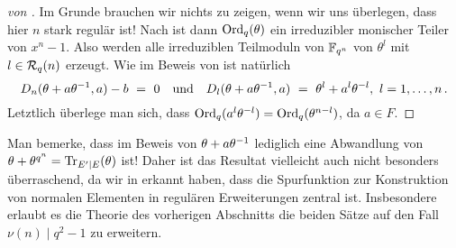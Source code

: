 \begin{proof}[von ]
  Im Grunde brauchen wir nichts zu zeigen, wenn wir uns überlegen, dass
  hier $n$ stark regulär ist! Nach 
  ist dann $\operatorname{Ord}_q(\theta)$ ein irreduzibler monischer Teiler von $x^n-1$. Also
  werden alle irreduziblen Teilmoduln von $\mathbb{F}_{q^n}$ von $\theta^l$ mit 
  $l\in \mathcal{R}_q(n)$ erzeugt.  Wie im Beweis von  ist
  natürlich 
  \[ D_n(\theta+a\theta\inv,a)-b \speq= 0 \quad\text{und}\quad
    D_l(\theta+a\theta\inv,a) \speq= \theta^l+a^l\theta^{-l},\ l=1,\ldots,n\,. \]
  Letztlich überlege man sich, dass $\operatorname{Ord}_q(a^l\theta^{-l}) =
  \operatorname{Ord}_q(\theta^{n-l})$, da $a \in F$. 
\end{proof}


Man bemerke, dass im Beweis von 
$\theta + a\theta^{-1}$ lediglich eine
Abwandlung von $\theta + \theta^{q^n} = \operatorname{Tr}_{E'\mid E}(\theta)$ ist!
Daher ist das Resultat vielleicht auch nicht besonders überraschend,
da wir in  erkannt haben, dass die Spurfunktion
zur Konstruktion von normalen Elementen in regulären Erweiterungen zentral ist.
Insbesondere erlaubt es die Theorie des vorherigen Abschnitts die beiden Sätze 
auf den Fall $\nu(n)\mid q^2-1$ zu erweitern.

